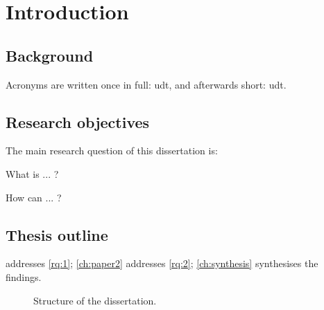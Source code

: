 \chapter{Introduction}
\label{ch:introduction}
\glsresetall

\clearpage   %

\section{Background}
\label{sec:intro:background}
\lipsum[1]

Acronyms are written once in full: \gls{udt}, and afterwards short: \gls{udt}.

\section{Research objectives}
\label{sec:intro:objectives}
The main research question of this dissertation is:

\mainrq

\begin{ResearchQuestion}\label{rq:1}
    What is ... ?
\end{ResearchQuestion}

\begin{ResearchQuestion}\label{rq:2}
    How can ... ?
\end{ResearchQuestion}

\section{Thesis outline}
\label{sec:intro:outline}
 addresses \cref{rq:1}; \cref{ch:paper2} addresses \cref{rq:2};
\cref{ch:synthesis} synthesises the findings.

\begin{figure}[h]
    \centering
    \caption{Structure of the dissertation.}
    \label{fig:intro:outline}
\end{figure}
